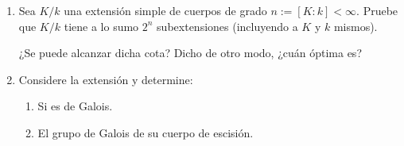 \documentclass[11pt, reqno]{amsart}
\begin{document}
\begin{enumerate}
	\item\label{exr:simple_subextension_count}\lookright
		Sea $K/k$ una extensión simple de cuerpos de grado $n := [K:k] < \infty$.
		Pruebe que $K/k$ tiene a lo sumo $2^n$ subextensiones (incluyendo a $K$ y $k$ mismos).

		\begin{prob}
			¿Se puede alcanzar dicha cota? Dicho de otro modo, ¿cuán óptima es?
		\end{prob}


	\item Considere la extensión  y determine:
		\begin{multicols}{2}
			\begin{enumerate}
				\item Si es de Galois.
				\item El grupo de Galois de su cuerpo de escisión.
			\end{enumerate}
		\end{multicols}
\end{enumerate}

\appendix
\end{document}
